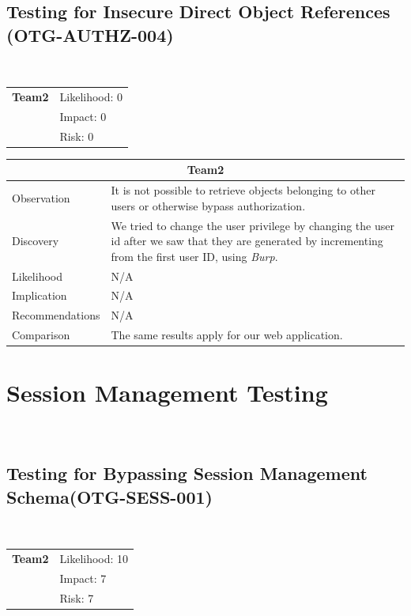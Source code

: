 \documentclass[headsepline,footsepline,footinclude=false,oneside,fontsize=11pt,paper=a4,listof=totoc,bibliography=totoc]{scrbook} %
\begin{document}
\subsection{Testing for Insecure Direct Object References (OTG-AUTHZ-004)}\
\begin{tabular}{cR{12cm}}
	\textbf{Team2} & Likelihood: 0\\& Impact: 0\\& Risk: 0
\end{tabular}

\begin{tabular}{ l|p{11cm}  }
	\hline
	\multicolumn{2}{c}{\textbf{Team2}} \\
	\hline
	Observation   & It is not possible to retrieve objects belonging to other users or otherwise bypass authorization.  \\
	Discovery  & We tried to change the user privilege by changing the user id after we saw that they are generated by incrementing from the first user ID, using \textit{Burp}.\\
	Likelihood & N/A \\
	Implication    & N/A \\
	Recommendations & N/A \\
	Comparison & The same results apply for our web application.\\
	\hline
\end{tabular}
\pagebreak
\section{Session Management Testing}\
\subsection{Testing for Bypassing Session Management Schema(OTG-SESS-001)}\

\begin{tabular}{cR{12cm}}
	\textbf{Team2} & Likelihood: 10\\ & Impact: 7\\& Risk: 7
\end{tabular}
\end{document}
